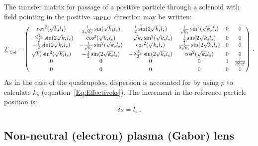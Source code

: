 The transfer matrix for passage of a positive particle through a
solenoid with field pointing in the positive $z_{\rm RPLC}$ direction
may be written: 
\begin{equation}
  \underline{\underline{T}}_{\rm~Sol} =
    \begin{pmatrix}
                           \cos^2(\sqrt{k_s} l_s) &   \frac{1}{2\sqrt{k_s}} \sin(\sqrt{k_s} l_s) &           \frac{1}{2} \sin(2\sqrt{k_s} l_s) & \frac{1}{\sqrt{k_s}} \sin^2(\sqrt{k_s} l_s) & 0 & 0 \\
      -\frac{\sqrt{k_s}}{2} \sin(2\sqrt{k_s} l_s) &                       \cos^2(\sqrt{k_s} l_s) &           -\sqrt{k_s}\sin^2(\sqrt{k_s} l_s) &           \frac{1}{2} \sin(2\sqrt{k_s} l_s) & 0 & 0 \\
               -\frac{1}{2} \sin(2\sqrt{k_s} l_s) & -\frac{1}{\sqrt{k_s}} \sin^2(\sqrt{k_s} l_s) &                      \cos^2(\sqrt{k_s} l_s) & \frac{1}{2\sqrt{k_s}} \sin(2\sqrt{k_s} l_s) & 0 & 0 \\
                \sqrt{k_s} \sin^2(\sqrt{k_s} l_s) &           -\frac{1}{2} \sin(2\sqrt{k_s} l_s) & -\frac{\sqrt{k_s}}{2} \sin(2\sqrt{k_s} l_s) &                      \cos^2(\sqrt{k_s} l_s) & 0 & 0 \\
          0 & 0 & 0 & 0 & 1 & \frac{l}{\beta_0^2 \gamma_0^2} \\
          0 & 0 & 0 & 0 & 0 &                             1
        \end{pmatrix} \, .
\end{equation}
As in the case of the quadrupoles, dispersion is accounted for by
using $p$ to calculate $k_s$ (equation~\ref{Eq:Effectiveks}).
The increment in the reference particle position is:
\begin{equation}
  \delta s = l_s \, .
\end{equation}

\subsection{Non-neutral (electron) plasma (Gabor) lens}
\label{SubSect:TrnsFrMtrx:GL}

